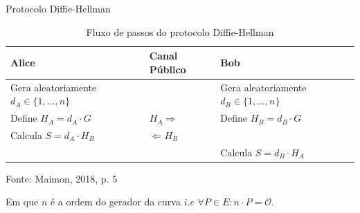 \documentclass[brazil]{beamer}
\begin{document}
\begin{frame}{Protocolo Diffie-Hellman}
 
	\begin{table}[h]\centering
		\vspace*{-0.4cm}
		\caption{Fluxo de passos do protocolo Diffie-Hellman } \label{table:aaf511d5-7922-48dd-b5ad-bf89a728b528}
		\centering
		\begin{tabular}{|p{3cm}|p{3cm}|p{3cm}|}
			\hline
			\textbf{Alice}                                 & \textbf{Canal Público} & \textbf{Bob}                                   \\
			\hline
			Gera aleatoriamente $d_A \in \{1, \ldots, n\}$ &                        & Gera aleatoriamente $d_B \in \{1, \ldots, n\}$ \\
			\hline
			Define $H_A = d_A \cdot G$                     & $H_A \Rightarrow $     & Define $H_B = d_B \cdot G$                     \\
			\hline
			Calcula $S = d_A \cdot H_B$                    & $\Leftarrow H_B$       &                                                \\
			\hline
			&                        & Calcula $S = d_B \cdot H_A$                    \\
			\hline
		\end{tabular}
	 
		\vspace*{0.4cm}Fonte:  Maimon, 2018,  p. 5
	\end{table}
	Em que $n$ é a ordem do gerador da curva $i.e$ $\forall P \in E:  n \cdot P =  \mathcal{O}$.
 

\end{frame}
\end{document}
